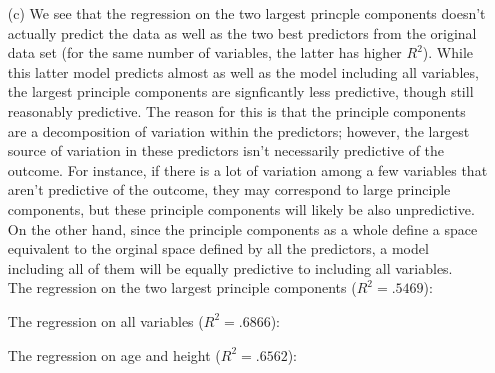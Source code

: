 \documentclass[11pt]{article}
\theoremstyle{definition}
\begin{document}
\begin{itemize}
\begin{itemize}
            \item[(c)] 
            We see that the regression on the two largest princple components doesn't actually predict the data as well as the two best predictors from the original data set (for the same number of variables, the latter has higher $R^2$). While this latter model predicts almost as well as the model including all variables, the largest principle components are signficantly less predictive, though still reasonably predictive. The reason for this is that the principle components are a decomposition of variation within the predictors; however, the largest source of variation in these predictors isn't necessarily predictive of the outcome. For instance, if there is a lot of variation among a few variables that aren't predictive of the outcome, they may correspond to large principle components, but these principle components will likely be also unpredictive. On the other hand, since the principle components as a whole define a space equivalent to the orginal space defined by all the predictors, a model including all of them will be equally predictive to including all variables.  \\
            \smallskip
            The regression on the two largest principle components ($R^2=.5469$):
            \FloatBarrier
             
            \FloatBarrier
            The regression on all variables ($R^2=.6866$):
            \FloatBarrier
             
            \FloatBarrier
            The regression on age and height ($R^2=.6562$):
            \FloatBarrier
             
            \FloatBarrier
        \end{itemize}
 
 
    

\end{itemize}
\end{document}
